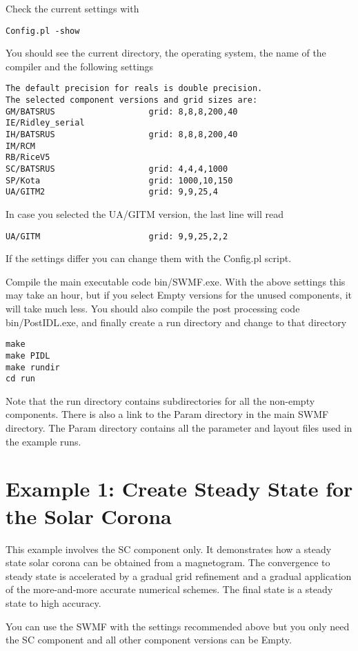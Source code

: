 Check the current settings with
\begin{verbatim}
Config.pl -show
\end{verbatim}
You should see the current directory, the operating system, the name
of the compiler and the following settings
\begin{verbatim}
The default precision for reals is double precision.
The selected component versions and grid sizes are:
GM/BATSRUS                   grid: 8,8,8,200,40
IE/Ridley_serial             
IH/BATSRUS                   grid: 8,8,8,200,40
IM/RCM                       
RB/RiceV5                    
SC/BATSRUS                   grid: 4,4,4,1000
SP/Kota                      grid: 1000,10,150
UA/GITM2                     grid: 9,9,25,4
\end{verbatim}
In case you selected the UA/GITM version, the last line will read
\begin{verbatim}
UA/GITM                      grid: 9,9,25,2,2
\end{verbatim}
If the settings differ you can change them with the Config.pl script.

Compile the main executable code bin/SWMF.exe. With the above
settings this may take an hour, but if you select Empty versions
for the unused components, it will take much less.
You should also compile the post processing code bin/PostIDL.exe,
and finally create a run directory and change to that directory
\begin{verbatim}
make
make PIDL
make rundir
cd run
\end{verbatim}
Note that the run directory contains subdirectories for all the
non-empty components. There is also a link to the Param directory
in the main SWMF directory. The Param directory contains all the
parameter and layout files used in the example runs.

\section{Example 1: Create Steady State for the Solar Corona}

This example involves the SC component only. It demonstrates
how a steady state solar corona can be obtained from
a magnetogram. The convergence to steady state is accelerated by 
a gradual grid refinement and a gradual application of the
more-and-more accurate numerical schemes. The final state
is a steady state to high accuracy. 

You can use the SWMF with the settings recommended above
but you only need the SC component and
all other component versions can be Empty.

